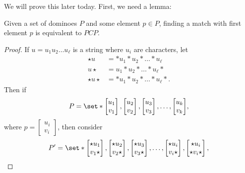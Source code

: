 \documentclass{standalone}
\begin{document}
We will prove this later today. First, we need a lemma:
\begin{lemma}
  Given a set of dominoes \(P\) and some element \(p \in P\),
  finding a match with first element \(p\) is equivalent to \(\mathit{PCP}\).
\end{lemma}
\begin{proof}
  If \(u = u_1 u_2 \dots u_\ell\) is a string where \(u_i\) are characters, let
  \begin{align*}
    \star u &= * u_1 * u_2 * \dots * u_\ell \\
    u \star &= u_1 * u_2 * \dots * u_\ell * \\
    \star u \star &= * u_1 * u_2 * \dots * u_\ell *.
  \end{align*}
  Then if
  \[
    P = \set*{
      \begin{bmatrix} u_1 \\ v_1 \end{bmatrix},
      \begin{bmatrix} u_2 \\ v_2 \end{bmatrix},
      \begin{bmatrix} u_3 \\ v_3 \end{bmatrix}, \dots,
      \begin{bmatrix} u_k \\ v_k \end{bmatrix}
    },
  \]
  where \(p = \begin{bmatrix} u_i \\ v_i \end{bmatrix}\), then consider
  \[
    P' = \set*{
      \begin{bmatrix} \star u_1 \\ v_1 \star \end{bmatrix},
      \begin{bmatrix} \star u_2 \\ v_2 \star \end{bmatrix},
      \begin{bmatrix} \star u_3 \\ v_3 \star \end{bmatrix}, \dots,
      \begin{bmatrix} \star u_i \\ v_i \star \end{bmatrix},
      \begin{bmatrix} \star u_i \\ \star v_i \star \end{bmatrix},
}\]
\end{proof}
\end{document}

